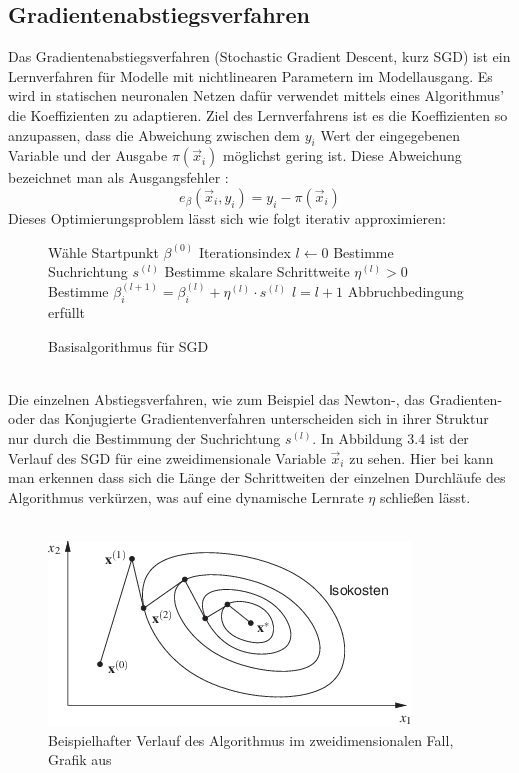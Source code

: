 \subsection{Gradientenabstiegsverfahren}
Das Gradientenabstiegsverfahren (Stochastic Gradient Descent, kurz SGD) ist ein Lernverfahren für Modelle mit nichtlinearen Parametern im Modellausgang. Es wird in statischen neuronalen Netzen dafür verwendet mittels eines Algorithmus' die Koeffizienten zu adaptieren. Ziel des Lernverfahrens ist es die Koeffizienten so anzupassen, dass die Abweichung  zwischen dem $y_i$ Wert der eingegebenen Variable und der Ausgabe $\pi(\vec x_i)$ möglichst gering ist. Diese Abweichung bezeichnet man als Ausgangsfehler \cite{IV}:
\begin{displaymath}
e_{\beta}(\vec x_i , y_i)=y_i-\pi(\vec x_i)
\end{displaymath}
Dieses Optimierungsproblem lässt sich wie folgt iterativ approximieren:
\begin{figure}[ht]
\centering
\begin{algorithmic}[1]
\STATE Wähle Startpunkt $\beta^{(0)}$
\STATE Iterationsindex $l \leftarrow 0$
\REPEAT
\STATE Bestimme Suchrichtung $s^{(l)}$
\STATE Bestimme skalare Schrittweite $\eta^{(l)} > 0$
\STATE Bestimme $\beta_i^{(l+1)} = \beta_i^{(l)} + \eta^{(l)} \cdot s^{(l)}$
\ENDFOR
\STATE $l=l+1$
\UNTIL Abbruchbedingung erfüllt
\end{algorithmic}
\caption{Basisalgorithmus für SGD}
\end{figure}\\
Die einzelnen Abstiegsverfahren, wie zum Beispiel das Newton-, das Gradienten- oder das Konjugierte Gradientenverfahren unterscheiden sich in ihrer Struktur nur durch die Bestimmung der Suchrichtung $s^{(l)}$\cite{PAPA}. In Abbildung 3.4 ist der Verlauf des SGD für eine zweidimensionale Variable $\vec x_i$ zu sehen. Hier bei kann man erkennen dass sich die Länge der Schrittweiten der einzelnen Durchläufe des Algorithmus verkürzen, was auf eine dynamische Lernrate $\eta$ schließen lässt.\\\\
\begin{figure}[ht]
\centering
\includegraphics[scale=1.7]{bilder/SGD}
\caption{Beispielhafter Verlauf des Algorithmus im zweidimensionalen Fall, Grafik aus \cite{PAPA}}
\end{figure}\newpage
